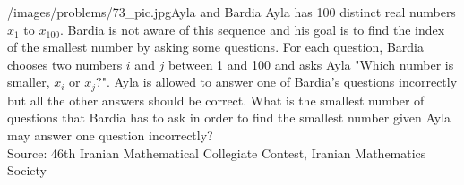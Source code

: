 \begin{problem}{/images/problems/73_pic.jpg}{Ayla and Bardia} Ayla has 100 distinct real numbers $x_1$ to $x_{100}$. Bardia is not aware of this sequence and his goal is to find the index of the smallest number by asking some questions. For each question, Bardia chooses two numbers $i$ and $j$ between 1 and 100 and asks Ayla "Which number is smaller, $x_i$ or $x_j?$". Ayla is allowed to answer one of Bardia's questions incorrectly but all the other answers should be correct. What is the smallest number of questions that Bardia has to ask in order to find the smallest number given Ayla may answer one question incorrectly?\\[0.2cm]
	
Source: 46th Iranian Mathematical Collegiate Contest, Iranian Mathematics Society
\end{problem}
